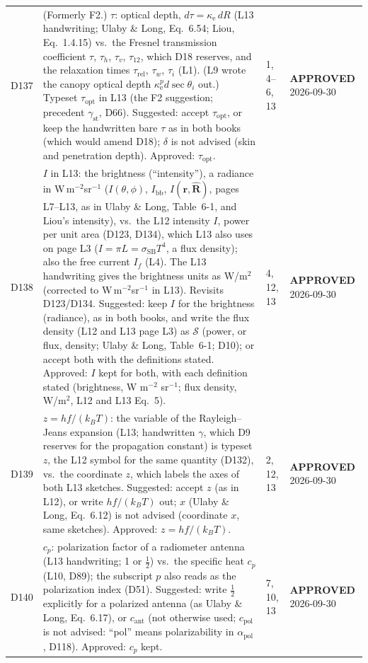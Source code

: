 \documentclass[11pt, oneside]{article}
\newcommand{\approved}{\textbf{APPROVED}}
\begin{document}
\begin{longtable}{l >{\raggedright\arraybackslash}p{} l l}
D137 & (Formerly F2.) $\tau$: optical depth, $d\tau = \kappa_\mathrm{e}\,dR$ (L13 handwriting; Ulaby \& Long, Eq.~6.54; Liou, Eq.~1.4.15) vs.\ the Fresnel transmission coefficient $\tau$, $\tau_h$, $\tau_v$, $\tau_{12}$, which D18 reserves, and the relaxation times $\tau_\mathrm{rel}$, $\tau_w$, $\tau_i$ (L1). (L9 wrote the canopy optical depth $\kappa_\mathrm{e}^pd\sec\theta_i$ out.) Typeset $\tau_\mathrm{opt}$ in L13 (the F2 suggestion; precedent $\gamma_\mathrm{st}$, D66). Suggested: accept $\tau_\mathrm{opt}$, or keep the handwritten bare $\tau$ as in both books (which would amend D18); $\delta$ is not advised (skin and penetration depth). Approved: $\tau_\mathrm{opt}$. & 1, 4--6, 13 & \approved{} 2026-09-30 \\
D138 & $I$ in L13: the brightness (``intensity''), a radiance in W\,m$^{-2}$sr$^{-1}$ ($I(\theta,\phi)$, $I_\mathrm{bb}$, $I(\mathbf{r},\hat{\mathbf{R}})$, pages L7--L13, as in Ulaby \& Long, Table~6-1, and Liou's intensity), vs.\ the L12 intensity $I$, power per unit area (D123, D134), which L13 also uses on page L3 ($I = \pi L = \sigma_\mathrm{SB}T^4$, a flux density); also the free current $I_f$ (L4). The L13 handwriting gives the brightness units as W/m$^2$ (corrected to W\,m$^{-2}$sr$^{-1}$ in L13). Revisits D123/D134. Suggested: keep $I$ for the brightness (radiance), as in both books, and write the flux density (L12 and L13 page L3) as $\mathcal{S}$ (power, or flux, density; Ulaby \& Long, Table~6-1; D10); or accept both with the definitions stated. Approved: $I$ kept for both, with each definition stated (brightness, W m$^{-2}$ sr$^{-1}$; flux density, W/m$^2$, L12 and L13 Eq.~5). & 4, 12, 13 & \approved{} 2026-09-30 \\
D139 & $z = hf/(k_BT)$: the variable of the Rayleigh--Jeans expansion (L13; handwritten $\gamma$, which D9 reserves for the propagation constant) is typeset $z$, the L12 symbol for the same quantity (D132), vs.\ the coordinate $z$, which labels the axes of both L13 sketches. Suggested: accept $z$ (as in L12), or write $hf/(k_BT)$ out; $x$ (Ulaby \& Long, Eq.~6.12) is not advised (coordinate $x$, same sketches). Approved: $z = hf/(k_BT)$. & 2, 12, 13 & \approved{} 2026-09-30 \\
D140 & $c_p$: polarization factor of a radiometer antenna (L13 handwriting; 1 or $\tfrac12$) vs.\ the specific heat $c_p$ (L10, D89); the subscript $p$ also reads as the polarization index (D51). Suggested: write $\tfrac12$ explicitly for a polarized antenna (as Ulaby \& Long, Eq.~6.17), or $c_\mathrm{ant}$ (not otherwise used; $c_\mathrm{pol}$ is not advised: ``pol'' means polarizability in $\alpha_\mathrm{pol}$, D118). Approved: $c_p$ kept. & 7, 10, 13 & \approved{} 2026-09-30 \\

\end{longtable}
\end{document}
